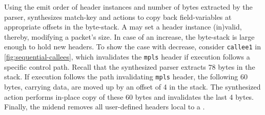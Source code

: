 \documentclass[letterpaper,twocolumn,10pt]{article}
\begin{document}



%
Using the emit order of header instances and number of bytes extracted
by the parser, \ucomp synthesizes match-key and actions to copy back
field-variables at appropriate offsets in the byte-stack. A \uprogram
may set a header instance (in)valid, thereby, modifying a packet's
size.  In case of an increase, the byte-stack is large enough to hold
new headers. To show the case with decrease, consider \texttt{callee1}
in \cref{fig:sequential-callees}, which invalidates the \texttt{mpls}
header if execution follows a specific control path. Recall that the
synthesized parser extracts 78 bytes in the stack. If execution
follows the path invalidating \texttt{mpls} header, the following 60
bytes, carrying data, are moved up by an offset of 4 in the stack. The
synthesized action performs in-place copy of these 60 bytes and
invalidates the last 4 bytes.
Finally, the midend removes all user-defined headers local to a
\uprogram.
\end{document}
